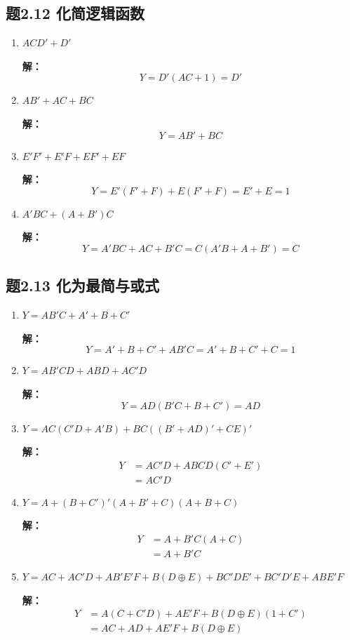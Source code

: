 \subsection{题2.12 化简逻辑函数}
\begin{enumerate}
    \item $ACD' + D'$

    \textbf{解：}
    \[
    Y = D'(AC + 1) = D'
    \]

    \item $AB' + AC + BC$

    \textbf{解：}
    \[
    Y = AB' + BC
    \]

    \item $E'F' + E'F + EF' + EF$

    \textbf{解：}
    \[
    Y = E'(F'+F) + E(F'+F) = E' + E = 1
    \]

    \item $A'BC + (A + B')C$

    \textbf{解：}
    \[
    Y = A'BC + AC + B'C = C(A'B + A + B') = C
    \]
\end{enumerate}

\subsection{题2.13 化为最简与或式}
\begin{enumerate}
    \item $Y = AB'C + A' + B + C'$

    \textbf{解：}
    \[
    Y = A' + B + C' + AB'C = A' + B + C' + C = 1
    \]

    \item $Y = AB'CD + ABD + AC'D$

    \textbf{解：}
    \[
    Y = AD(B'C + B + C') = AD
    \]

    \item $Y = AC(C'D + A'B) + BC((B' + AD)' + CE)'$

    \textbf{解：}
    \begin{align*}
    Y &= AC'D + ABCD(C' + E') \\
      &= AC'D
    \end{align*}

    \item $Y = A + (B + C')'(A + B' + C)(A + B + C)$

    \textbf{解：}
    \begin{align*}
    Y &= A + B'C(A + C) \\
      &= A + B'C
    \end{align*}

    \item $Y = AC + AC'D + AB'E'F + B(D \oplus E) + BC'DE' + BC'D'E + ABE'F$

    \textbf{解：}
    \begin{align*}
    Y &= A(C + C'D) + AE'F + B(D \oplus E)(1 + C') \\
      &= AC + AD + AE'F + B(D \oplus E)
    \end{align*}
\end{enumerate}

